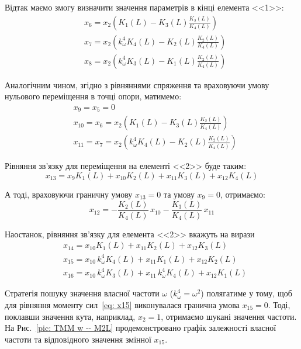 Відтак маємо змогу визначити значення параметрів в кінці елемента <<1>>:
\begin{align}\label{eq: x6 x7 x8}
    & x_6 = x_2 \left( K_1(L) - K_3(L)\frac{K_2(L)}{K_4(L)} \right) \\
    & x_7 = x_2 \left( k_{\omega}^4 K_4(L) - K_2(L)\frac{K_2(L)}{K_4(L)} \right) \\
    & x_8 = x_2 \left( k_{\omega}^4 K_3(L) - K_1(L)\frac{K_2(L)}{K_4(L)} \right)
\end{align}

Аналогічним чином, згідно з рівняннями спряження та враховуючи умову нульового переміщення в точці опори, матимемо:
\begin{align}\label{eq: x10 x11 x12}
    & x_9 = x_5 = 0 \\
    & x_{10} = x_6 = x_2 \left( K_1(L) - K_3(L)\frac{K_2(L)}{K_4(L)} \right) \\
    & x_{11} = x_7 = x_2 \left( k_{\omega}^4 K_4(L) - K_2(L)\frac{K_2(L)}{K_4(L)} \right)
\end{align}

Рівняння зв'язку для переміщення на елементі <<2>> буде таким:
\begin{equation}\label{eq: x13}
    x_{13} = x_{9} K_1(L) + x_{10} K_2(L) + x_{11} K_3(L) + x_{12} K_4(L)
\end{equation}

А тоді, враховуючи граничну умову $x_{13}=0$ та умову $x_{9}=0$, отримаємо:
\begin{equation}\label{eq: x13 final}
    x_{12} = -\frac{K_2(L)}{K_4(L)}\,x_{10} - \frac{K_3(L)}{K_4(L)}\,x_{11}
\end{equation}

Наостанок, рівняння зв'язку для елемента <<2>> вкажуть на вирази
\begin{align}
    & x_{14} = x_{10} K_1(L) + x_{11} K_2(L) + x_{12} K_3(L) \label{eq: x14} \\
    & x_{15} = x_{10}\, k_{\omega}^4 K_4(L) + x_{11} K_1(L) + x_{12} K_2(L) \label{eq: x15} \\
    & x_{16} = x_{10}\, k_{\omega}^4 K_3(L) + x_{11}\, k_{\omega}^4 K_4(L) + x_{12} K_1(L) \label{eq: x16}
\end{align}

Стратегія пошуку значення власної частоти $\omega$ ($k_{\omega}^4=\omega^2$) полягатиме у тому, щоб для рівняння моменту сил~\eqref{eq: x15} виконувалася гранична умова $x_{15}=0$. Тоді, поклавши значення кута, наприклад, $x_2=1$, отримаємо шукані значення частоти. На Рис.~\ref{pic: TMM w -- M2L} продемонстровано графік залежності власної частоти та відповідного значення змінної $x_{15}$.

